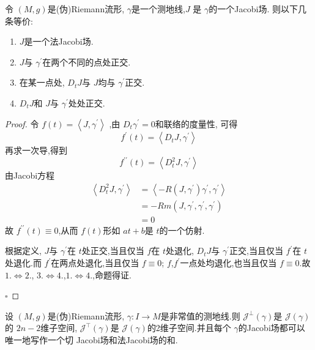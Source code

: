 \documentclass[../../几何与拓扑.tex]{subfiles}
\begin{document}
\begin{proposition}
    令 \(  \left( M,g \right)   \)是(伪)Riemann流形, \(   \gamma   \)是一个测地线,\(  J  \) 是 \(   \gamma   \)的一个Jacobi场.  则以下几条等价:
    \begin{enumerate}
        \item  \(  J  \)是一个法Jacobi场.
        \item \(  J  \)与 \(   \gamma ^{\prime}   \)在两个不同的点处正交.
        \item 在某一点处, \(  D_{t}J  \)与 \(  J  \)均与 \(   \gamma ^{\prime}   \)正交.   
        \item  \(  D_{t}J  \)和 \(  J  \)与 \(   \gamma ^{\prime}   \)处处正交.    
    \end{enumerate}
     
\end{proposition}

\begin{proof}
    令 \(  f\left( t \right)= \left<J, \gamma ^{\prime}  \right>   \) ,由 \(  D_{t} \gamma ^{\prime} = 0  \)和联络的度量性, 可得  \[
    f^{\prime} \left( t \right)= \left<D_{t}J, \gamma ^{\prime}  \right>  
    \]再求一次导,得到 \[
    f^{\prime \prime} \left( t \right)= \left<D^{2}_{t}J, \gamma ^{\prime}  \right> 
    \]由Jacobi方程 \[
    \begin{aligned}
        \left<D_{t}^{2}J, \gamma ^{\prime}  \right>& = \left<-R\left( J, \gamma ^{\prime}  \right) \gamma ^{\prime} , \gamma ^{\prime}   \right> \\ 
         & = -Rm\left( J, \gamma ^{\prime} , \gamma ^{\prime} , \gamma ^{\prime}  \right) \\ 
          & = 0 
    \end{aligned}
    \]故 \(  f^{\prime \prime} \left( t \right)\equiv 0   \),从而 \(  f\left( t \right)   \)形如 \(  at+ b  \)是 \(  t  \)的一个仿射.
    
    根据定义, \(  J  \)与 \(   \gamma ^{\prime}   \)在 \(  t  \)处正交,当且仅当 \(  f  \)在 \(  t  \)处退化, \(  D_{t}J  \)与 \(   \gamma ^{\prime}   \)正交,当且仅当 \(  f^{\prime}   \)在 \(  t  \)处退化.而 \(  f^{\prime}   \)在两点处退化,当且仅当 \(  f\equiv 0  \); \(  f  \),\(  f^{\prime}   \)一点处均退化,也当且仅当 \(  f\equiv 0  \).故 \(  1.\iff 2.  \), \(  3.\iff 4.  \),\(  1.\iff 4.  \),命题得证.                 

    \hfill $\square$
\end{proof}

\begin{corollary}
    设 \(  \left( M,g \right)   \)是(伪)Riemann流形, \(   \gamma :I\to M  \)是非常值的测地线.则 \(  \mathscr{J}^{\perp}\left(  \gamma  \right)   \)是 \(  \mathscr{J}\left(  \gamma  \right)   \)的 \(  2n-2  \)维子空间, \(  \mathscr{J}^{\top}\left(  \gamma  \right)   \)是 \(  \mathscr{J}\left(  \gamma  \right)   \)的2维子空间.并且每个  \(   \gamma   \)的Jacobi场都可以唯一地写作一个切 Jacobi场和法Jacobi场的和.        
\end{corollary}
\end{document}
